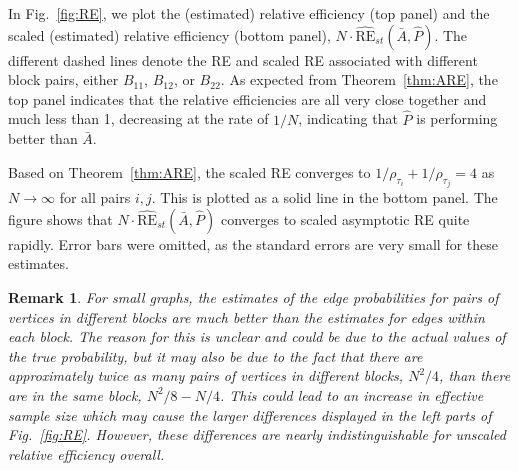\documentclass[journal,twoside,web]{ieeecolor}
\newtheorem{remark}[fact]{Remark}
\begin{document}
In Fig.~\ref{fig:RE}, we plot the (estimated) relative efficiency (top panel) and the scaled (estimated) relative efficiency (bottom panel), $N \cdot \hat{\mathrm{RE}}_{st}(\bar{A},\hat{P})$.
The different dashed lines denote the RE and scaled RE associated with different block pairs, either $B_{11}$, $B_{12}$, or $B_{22}$.
As expected from Theorem~\ref{thm:ARE}, the top panel indicates that the relative efficiencies are all very close together and much less than 1, decreasing at the rate of $1/N$, indicating that $\hat{P}$ is performing better than $\bar{A}$.

Based on Theorem~\ref{thm:ARE}, the scaled RE converges to $1/\rho_{\tau_i}+1/\rho_{\tau_j}=4$ as $N\to\infty$ for all pairs $i,j$.
This is plotted as a solid line in the bottom panel.
The figure shows that $N \cdot \hat{\mathrm{RE}}_{st}(\bar{A}, \hat{P})$ converges to scaled asymptotic RE quite rapidly.
Error bars were omitted, as the standard errors are very small for these estimates.

\begin{remark}
For small graphs, the estimates of the edge probabilities for pairs of vertices in different blocks are much better than the estimates for edges within each block.
The reason for this is unclear and could be due to the actual values of the true probability, but it may also be due to the fact that there are approximately twice as many pairs of vertices in different blocks, $N^2/4$, than there are in the same block, $N^2/8-N/4$.
This could lead to an increase in effective sample size which may cause the larger differences displayed in the left parts of Fig.~\ref{fig:RE}.
However, these differences are nearly indistinguishable for unscaled relative efficiency overall.
\end{remark}



\end{document}
